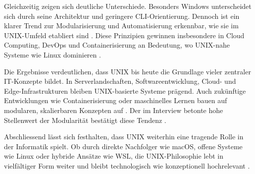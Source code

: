 Gleichzeitig zeigen sich deutliche Unterschiede. Besonders Windows unterscheidet sich durch seine Architektur und geringere CLI-Orientierung. Dennoch ist ein
klarer Trend zur Modularisierung und Automatisierung erkennbar, wie sie im UNIX-Umfeld etabliert sind \cite{ArtOfUnixProgramming, interviewNH}. Diese Prinzipien
gewinnen insbesondere in Cloud Computing, DevOps und Containerisierung an Bedeutung, wo UNIX-nahe Systeme wie Linux dominieren
\cite{ModernOS, OSConcept, interviewNH}.

Die Ergebnisse verdeutlichen, dass UNIX bis heute die Grundlage vieler zentraler IT-Konzepte bildet. In Serverlandschaften, Softwareentwicklung, Cloud- und
Edge-Infrastrukturen bleiben UNIX-basierte Systeme prägend. Auch zukünftige Entwicklungen wie Containerisierung oder maschinelles Lernen bauen auf modularen,
skalierbaren Konzepten auf \cite{ArtOfUnixProgramming, ModernOS, interviewNH}. Der im Interview betonte hohe Stellenwert der Modularität bestätigt diese Tendenz
\cite{interviewNH}.

Abschliessend lässt sich festhalten, dass UNIX weiterhin eine tragende Rolle in der Informatik spielt. Ob durch direkte Nachfolger wie macOS, offene Systeme wie
Linux oder hybride Ansätze wie WSL, die UNIX-Philosophie lebt in vielfältiger Form weiter und bleibt technologisch wie konzeptionell hochrelevant
\cite{ArtOfUnixProgramming, interviewNH}.